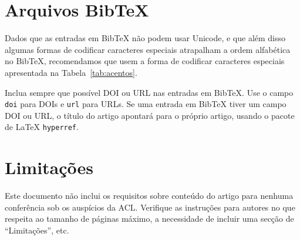 \documentclass[11pt]{article}
\begin{document}
\section{Arquivos Bib\TeX{}}
\label{sec:bibtex}

Dados que as entradas em Bib\TeX{} não podem usar Unicode, e que além disso algumas formas de codificar caracteres especiais atrapalham a ordem alfabética no Bib\TeX{}, recomendamos que usem a forma de codificar caracteres especiais apresentada na Tabela~\ref{tab:acentos}.

Inclua sempre que possível DOI ou URL nas entradas em Bib\TeX{}.
Use o campo \verb|doi| para DOIs e \verb|url| para URLs.
Se uma entrada em Bib\TeX{} tiver um campo DOI ou URL, o título do artigo apontará para o próprio artigo, usando o pacote de \LaTeX{} {\tt hyperref}.

\section*{Limitações}

Este documento não inclui os requisitos sobre conteúdo do artigo para nenhuma conferência sob os auspícios da ACL. Verifique as instruções para autores no que respeita ao tamanho de páginas máximo, a necessidade de incluir uma secção de ``Limitações'', etc.

\end{document}
